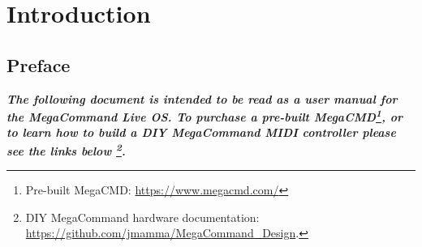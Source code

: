 \chapter{Introduction}
\section{Preface}
\begin{small}
\textbf{\textit{The following document is intended to be read as a user manual for the MegaCommand Live OS. To purchase a pre-built MegaCMD\footnote{Pre-built MegaCMD: \url{https://www.megacmd.com/}}, or to learn how to build a DIY MegaCommand MIDI controller please see the links below \footnote{DIY MegaCommand hardware documentation: \url{https://github.com/jmamma/MegaCommand_Design}.}.}}

\end{small}

